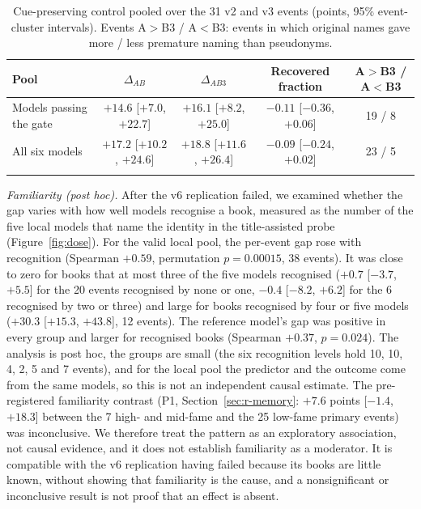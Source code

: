 \documentclass[sn-mathphys]{sn-jnl}%
\theoremstyle{thmstyleone}%
\theoremstyle{thmstyletwo}%
\theoremstyle{thmstylethree}%
\begin{document}
\begin{table}[!t]
\caption{Cue-preserving control pooled over the 31 v2 and v3 events (points, 95\% event-cluster intervals). Events A$>$B3 / A$<$B3: events in which original names gave more / less premature naming than pseudonyms.}\label{tab:cue}
\footnotesize
\begin{tabular*}{\textwidth}{@{\extracolsep\fill}p{2.5cm}cccc}
\toprule
Pool & $\Delta_{AB}$ & $\Delta_{AB3}$ & Recovered fraction & A$>$B3 / A$<$B3 \\
\midrule
Models passing the gate & $+14.6$ [$+7.0$, $+22.7$] & $+16.1$ [$+8.2$, $+25.0$] & $-0.11$ [$-0.36$, $+0.06$] & 19 / 8 \\
All six models & $+17.2$ [$+10.2$, $+24.6$] & $+18.8$ [$+11.6$, $+26.4$] & $-0.09$ [$-0.24$, $+0.02$] & 23 / 5 \\
\botrule
\end{tabular*}
\end{table}

\emph{Familiarity (post hoc).} After the v6 replication failed, we examined whether the gap varies with how well models recognise a book, measured as the number of the five local models that name the identity in the title-assisted probe (Figure~\ref{fig:dose}). For the valid local pool, the per-event gap rose with recognition (Spearman $+0.59$, permutation $p=0.00015$, 38 events). It was close to zero for books that at most three of the five models recognised ($+0.7$ [$-3.7$, $+5.5$] for the 20 events recognised by none or one, $-0.4$ [$-8.2$, $+6.2$] for the 6 recognised by two or three) and large for books recognised by four or five models ($+30.3$ [$+15.3$, $+43.8$], 12 events). The reference model's gap was positive in every group and larger for recognised books (Spearman $+0.37$, $p=0.024$). The analysis is post hoc, the groups are small (the six recognition levels hold 10, 10, 4, 2, 5 and 7 events), and for the local pool the predictor and the outcome come from the same models, so this is not an independent causal estimate. The pre-registered familiarity contrast (P1, Section~\ref{sec:r-memory}: $+7.6$ points [$-1.4$, $+18.3$] between the 7 high- and mid-fame and the 25 low-fame primary events) was inconclusive. We therefore treat the pattern as an exploratory association, not causal evidence, and it does not establish familiarity as a moderator. It is compatible with the v6 replication having failed because its books are little known, without showing that familiarity is the cause, and a nonsignificant or inconclusive result is not proof that an effect is absent.
\end{document}
